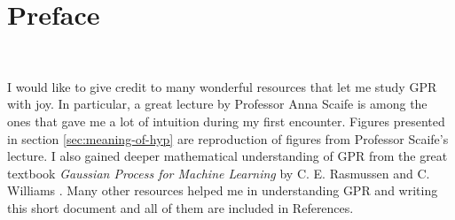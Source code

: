 \documentclass[10pt,twocolumn]{article}
\begin{document}


\vspace{10mm}

\setlength{\parindent}{0cm}

\fontsize{14}{10}\selectfont {Kamila Zdybał}

\vspace{2mm}

\fontsize{8}{10}

\fontsize{8}{10}

\section*{Preface}

\,\,

I would like to give credit to many wonderful resources that let me study GPR with joy. In particular, a great lecture by Professor Anna Scaife \cite{Scaife} is among the ones that gave me a lot of intuition during my first encounter. Figures presented in section \ref{sec:meaning-of-hyp} are reproduction of figures from Professor Scaife's lecture. I also gained deeper mathematical understanding of GPR from the great textbook \textit{Gaussian Process for Machine Learning} by C. E. Rasmussen and C. Williams \cite{Rasmussen}. Many other resources helped me in understanding GPR and writing this short document and all of them are included in References.
\end{document}
